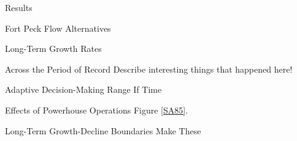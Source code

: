 \documentclass[12pt]{article}
\begin{document}
\begin{section}{Results}
\begin{subsection}{Fort Peck Flow Alternatives}
\begin{subsubsection}{Long-Term Growth Rates}
\begin{paragraph}{Across the Period of Record}
Describe interesting things that happened here!     
\end{paragraph}
\begin{paragraph}{Adaptive Decision-Making Range}
If Time
\end{paragraph}
\begin{paragraph}{Effects of Powerhouse Operations}
Figure \ref{SA85}.
\end{paragraph}
\end{subsubsection}
\begin{subsubsection}{Long-Term Growth-Decline Boundaries}
Make These
\end{subsubsection}
\end{subsection}

%
%
%
%
%
%
%
%

\end{section}
\end{document}
